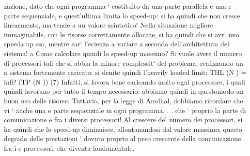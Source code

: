 \documentclass[a4paper,12pt]{article}
\begin{document}
zazione, dato che ogni programma ` costituito da una parte parallela e una
e
parte sequenziale, e quest'ultima limita lo speed-up: si ha quindi che non cresce
linearmente, ma tende a un valore asintotico! Nella situazione migliore immaginabile, con le risorse correttamente
allocate, si ha quindi che si avr` uno speeda
up sso, mentre sar` l'ecienza a variare a seconda dell'architettura del sistema!
a
Come calcolare quindi lo speed-up massimo? Si vuole avere il numero di
processori tali che si abbia la minore complessit` del problema, realizzando un
a
sistema fortemente caricato: si denite quindi l'heavily loaded limit:
THL (N ) = infP (TP (N ))
(7)
Infatti, si lavora bene caricando molto ogni processore, i quali quindi lavorano
per tutto il tempo necessario: abbiamo quindi in questomodo un buon uso delle
risorse.
Tuttavia, per la legge di Amdhal, dobbiamo ricordare che vi ` anche una
e
parte sequenziale in ogni programma. . . che ` proprio la parte di comunicazione
e
fra i diversi processori! Al crescere del numero dei processori, si ha quindi
che lo speed-up diminuisce, allontanandosi dal valore massimo; questo degrado
delle prestazioni ` dovuto proprio al peso crescente della comunicazione fra i
e
processori, che diventa fondamentale.
\end{document}
